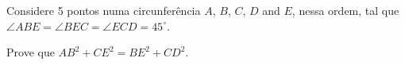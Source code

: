 Considere 5 pontos numa circunferência $A$, $B$, $C$, $D$ and $E$, nessa ordem, tal que $\angle ABE = \angle BEC = \angle ECD = 45^{\circ}$.

Prove que $AB^2 + CE^2 = BE^2 + CD^2$.
